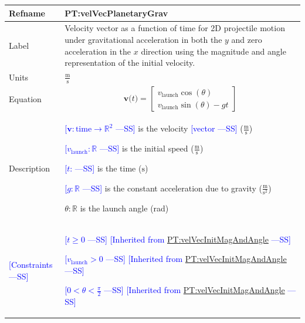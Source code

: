 \documentclass[12pt]{article}
\newcommand{\authornote}[3]{\textcolor{#1}{[#3 ---#2]}}
\newcommand{\authornote}[3]{}
\newcommand{\wss}[1]{\authornote{blue}{SS}{#1}}
\begin{document}
\noindent
\begin{minipage}{\textwidth}
\begin{tabular}{>{\raggedright}p{}>{\raggedright\arraybackslash}p{}}
\toprule \textbf{Refname} & \textbf{PT:velVecPlanetaryGrav} 
\label{PT:velVecPlanetaryGrav} \\ \midrule Label & Velocity vector as a function
of time for 2D projectile motion under gravitational acceleration in both the
$y$ and zero acceleration in the $x$ direction using the magnitude and angle
representation of the initial velocity.
        
\\ \midrule
Units & $\frac{\text{m}}{\text{s}}$
        
\\ \midrule
Equation & \begin{displaymath}
           \symbf{v}\text{(}t\text{)}=\begin{bmatrix}
                                      {{v}_{\text{launch}}} \cos(\theta)\\
                                      {{v}_{\text{launch}}} \sin(\theta) - gt
                                      \end{bmatrix}
           \end{displaymath}
\\ \midrule
Description & \begin{symbDescription}
              \item{\wss{$\symbf{v}: \text{time} \rightarrow \mathbb{R}^2$} is the velocity \wss{vector} ($\frac{\text{m}}{\text{s}}$)}
              \item{\wss{${{v}_{\text{launch}}}: \mathbb{R}$} is the initial speed ($\frac{\text{m}}{\text{s}}$)}
              \item{\wss{$t$: \text{time}} is the time (${\text{s}}$)}
              \item{\wss{$g: \mathbb{R}$} is the constant acceleration due to gravity ($\frac{\text{m}}{\text{s}^{2}}$)}
              \item $\theta: \mathbb{R}$ is the launch angle (rad)
              \end{symbDescription}

\\ \midrule
\wss{Constraints} & 
\begin{symbDescription}
\item \wss{$t \geq 0$} \wss{Inherited from
\hyperref[PT:velVecInitMagAndAngle]{PT:velVecInitMagAndAngle}}
\item \wss{$v_\text{launch} > 0$} \wss{Inherited from
\hyperref[PT:velVecInitMagAndAngle]{PT:velVecInitMagAndAngle}}
\item \wss{$ 0 < \theta < \frac{\pi}{2}$} \wss{Inherited from
\hyperref[PT:velVecInitMagAndAngle]{PT:velVecInitMagAndAngle}}
\end{symbDescription}


\end{tabular}
\end{minipage}
\end{document}
